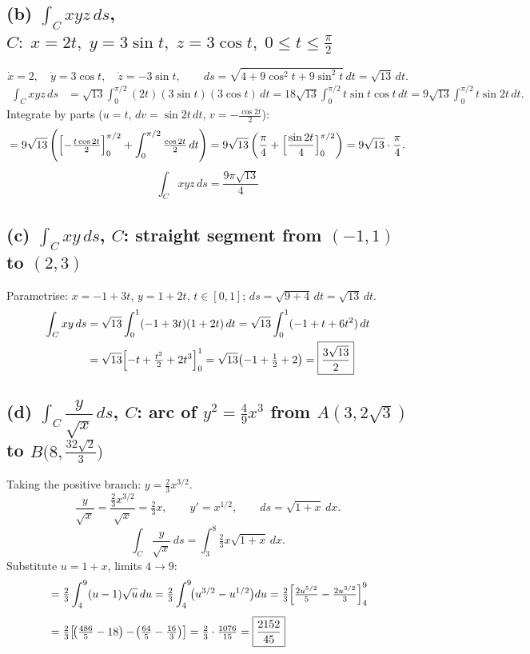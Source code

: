 \documentclass[12pt]{article}
\begin{document}
\subsection*{(b) $\displaystyle\int_C xyz\,ds$,\quad
  $C:\;x=2t,\;y=3\sin t,\;z=3\cos t,\;0\le t\le\tfrac{\pi}{2}$}

\[
  \dot{x}=2,\quad\dot{y}=3\cos t,\quad\dot{z}=-3\sin t,\qquad
  ds=\sqrt{4+9\cos^2 t+9\sin^2 t}\,dt=\sqrt{13}\,dt.
\]
\begin{align*}
  \int_C xyz\,ds
  &=\sqrt{13}\int_0^{\pi/2}(2t)(3\sin t)(3\cos t)\,dt
   =18\sqrt{13}\int_0^{\pi/2}t\sin t\cos t\,dt
   =9\sqrt{13}\int_0^{\pi/2}t\sin 2t\,dt.
\end{align*}
Integrate by parts ($u=t$, $dv=\sin 2t\,dt$, $v=-\tfrac{\cos 2t}{2}$):
\[
  =9\sqrt{13}\left(\Bigl[-\tfrac{t\cos 2t}{2}\Bigr]_0^{\pi/2}
    +\int_0^{\pi/2}\tfrac{\cos 2t}{2}\,dt\right)
  =9\sqrt{13}\left(\frac{\pi}{4}+\Bigl[\frac{\sin 2t}{4}\Bigr]_0^{\pi/2}\right)
  =9\sqrt{13}\cdot\frac{\pi}{4}.
\]
\[
  \boxed{\int_C xyz\,ds=\frac{9\pi\sqrt{13}}{4}}
\]

\subsection*{(c) $\displaystyle\int_C xy\,ds$,\quad
  $C$: straight segment from $(-1,1)$ to $(2,3)$}

Parametrise: $x=-1+3t$, $y=1+2t$, $t\in[0,1]$; \quad $ds=\sqrt{9+4}\,dt=\sqrt{13}\,dt$.
\begin{align*}
  \int_C xy\,ds
  &=\sqrt{13}\int_0^1(-1+3t)(1+2t)\,dt
   =\sqrt{13}\int_0^1(-1+t+6t^2)\,dt\\
  &=\sqrt{13}\Bigl[-t+\tfrac{t^2}{2}+2t^3\Bigr]_0^1
   =\sqrt{13}\!\left(-1+\tfrac{1}{2}+2\right)
   =\boxed{\dfrac{3\sqrt{13}}{2}}
\end{align*}

\subsection*{(d) $\displaystyle\int_C\dfrac{y}{\sqrt{x}}\,ds$,\quad
  $C$: arc of $y^2=\tfrac{4}{9}x^3$ from $A(3,2\sqrt{3})$ to $B\!\bigl(8,\tfrac{32\sqrt{2}}{3}\bigr)$}

Taking the positive branch: $y=\tfrac{2}{3}x^{3/2}$.
\[
  \frac{y}{\sqrt{x}}=\frac{\tfrac{2}{3}x^{3/2}}{\sqrt{x}}=\tfrac{2}{3}x,\qquad
  y'=x^{1/2},\qquad
  ds=\sqrt{1+x}\,dx.
\]
\[
  \int_C\frac{y}{\sqrt{x}}\,ds=\int_3^8\tfrac{2}{3}x\sqrt{1+x}\,dx.
\]
Substitute $u=1+x$, limits $4\to9$:
\begin{align*}
  &=\tfrac{2}{3}\int_4^9(u-1)\sqrt{u}\,du
   =\tfrac{2}{3}\int_4^9\!\bigl(u^{3/2}-u^{1/2}\bigr)du
   =\tfrac{2}{3}\Bigl[\tfrac{2u^{5/2}}{5}-\tfrac{2u^{3/2}}{3}\Bigr]_4^9\\[4pt]
  &=\tfrac{2}{3}\!\left[\!\left(\tfrac{486}{5}-18\right)-\!\left(\tfrac{64}{5}-\tfrac{16}{3}\right)\right]
   =\tfrac{2}{3}\cdot\tfrac{1076}{15}
   =\boxed{\dfrac{2152}{45}}
\end{align*}
\end{document}
